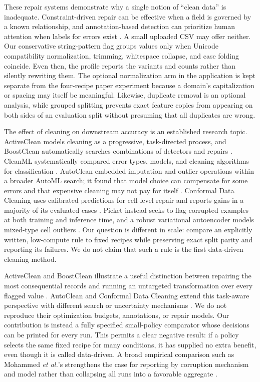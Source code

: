 \documentclass[conference]{IEEEtran}
\begin{document}
These repair systems demonstrate why a single notion of ``clean data'' is inadequate. Constraint-driven repair can be effective when a field is governed by a known relationship, and annotation-based detection can prioritize human attention when labels for errors exist \cite{Rekatsinas2017,Mahdavi2019,Lew2021}. A small uploaded CSV may offer neither. Our conservative string-pattern flag groups values only when Unicode compatibility normalization, trimming, whitespace collapse, and case folding coincide. Even then, the profile reports the variants and counts rather than silently rewriting them. The optional normalization arm in the application is kept separate from the four-recipe paper experiment because a domain's capitalization or spacing may itself be meaningful. Likewise, duplicate removal is an optional analysis, while grouped splitting prevents exact feature copies from appearing on both sides of an evaluation split without presuming that all duplicates are wrong.

The effect of cleaning on downstream accuracy is an established research topic. ActiveClean models cleaning as a progressive, task-directed process, and BoostClean automatically searches combinations of detectors and repairs \cite{Krishnan2016,Krishnan2017}. CleanML systematically compared error types, models, and cleaning algorithms for classification \cite{Li2021}. AutoClean embedded imputation and outlier operations within a broader AutoML search; it found that model choice can compensate for some errors and that expensive cleaning may not pay for itself \cite{Neutatz2022}. Conformal Data Cleaning uses calibrated predictions for cell-level repair and reports gains in a majority of its evaluated cases \cite{Jger2024}. Picket instead seeks to flag corrupted examples at both training and inference time, and a robust variational autoencoder models mixed-type cell outliers \cite{Liu2021,Eduardo2020}. Our question is different in scale: compare an explicitly written, low-compute rule to fixed recipes while preserving exact split parity and reporting its failures. We do not claim that such a rule is the first data-driven cleaning method.

ActiveClean and BoostClean illustrate a useful distinction between repairing the most consequential records and running an untargeted transformation over every flagged value \cite{Krishnan2016,Krishnan2017}. AutoClean and Conformal Data Cleaning extend this task-aware perspective with different search or uncertainty mechanisms \cite{Neutatz2022,Jger2024}. We do not reproduce their optimization budgets, annotations, or repair models. Our contribution is instead a fully specified small-policy comparator whose decisions can be printed for every run. This permits a clear negative result: if a policy selects the same fixed recipe for many conditions, it has supplied no extra benefit, even though it is called data-driven. A broad empirical comparison such as Mohammed \emph{et al.}'s strengthens the case for reporting by corruption mechanism and model rather than collapsing all runs into a favorable aggregate \cite{Mohammed2025}.
\end{document}
